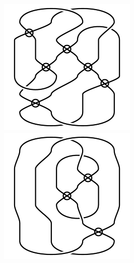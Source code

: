 \begin{figure}[H]
\begin{minipage}[b]{.18\linewidth}
\centering
\includegraphics[width=\linewidth]{../data/virtual_4_52.png}
\end{minipage}
\begin{minipage}[b]{.18\linewidth}
\centering
\includegraphics[width=\linewidth]{../data/virtual_4_53.png}

\end{minipage}
\end{figure}
